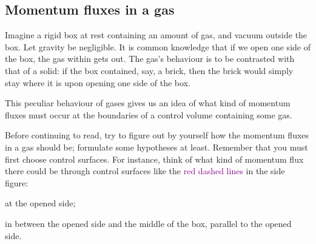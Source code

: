 \documentclass[a4paper,12pt,%
onecolumn,oneside,%
british%
]{memoir}
\renewcommand*{\|}[1][]{\nonscript\:#1\vert\nonscript\:\mathopen{}}
\begin{document}
\subsection{Momentum fluxes in a gas}
\label{sec:momentumflux_gas}

Imagine a rigid box at rest containing an amount of gas, and vacuum outside the box. Let gravity be negligible. It is common knowledge that if we open one side of the box, the gas within gets out. The gas's behaviour is to be contrasted with that of a solid: if the box contained, say, a brick, then the brick would simply stay where it is upon opening one side of the box.

This peculiar behaviour of gases gives us an idea of what kind of momentum fluxes must occur at the boundaries of a control volume containing some gas.

%
\begin{exercise}
  Before continuing to read, try to figure out by yourself how the momentum fluxes in a gas should be; formulate some hypotheses at least. Remember that you must first choose control surfaces. For instance, think of what kind of momentum flux there could be through control surfaces like the \textcolor{purple}{red dashed lines} in the side figure:
  \begin{enumerate*}[label=(\alph*)]
  \item at the opened side;
  \item in between the opened side and the middle of the box, parallel to the opened side.
  \end{enumerate*}
\end{exercise}
\end{document}

